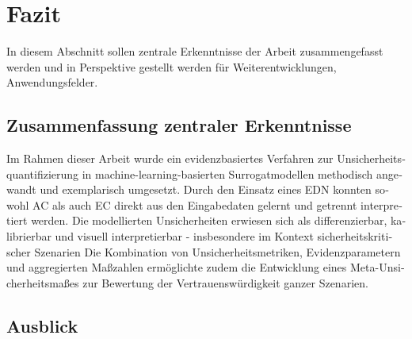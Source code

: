 
\chapter{Fazit}\label{chapter:fazit}



\begin{otherlanguage}{american}
%
%
%
\end{otherlanguage}



\begin{otherlanguage}{ngerman}
In diesem Abschnitt sollen zentrale Erkenntnisse der Arbeit zusammengefasst werden und in Perspektive gestellt werden für Weiterentwicklungen, Anwendungsfelder.

\section{Zusammenfassung zentraler Erkenntnisse}

Im Rahmen dieser Arbeit wurde ein evidenzbasiertes Verfahren zur Unsicherheitsquantifizierung in machine-learning-basierten Surrogatmodellen methodisch angewandt und exemplarisch umgesetzt. Durch den Einsatz eines EDN konnten sowohl AC als auch EC direkt aus den Eingabedaten gelernt und getrennt interpretiert werden. Die modellierten Unsicherheiten erwiesen sich als differenzierbar, kalibrierbar und visuell interpretierbar - insbesondere im Kontext sicherheitskritischer Szenarien %
Die Kombination von Unsicherheitsmetriken, Evidenzparametern und aggregierten Maßzahlen ermöglichte zudem die Entwicklung eines Meta-Unsicherheitsmaßes zur Bewertung der Vertrauenswürdigkeit ganzer Szenarien. %

\section{Ausblick}



\end{otherlanguage}
